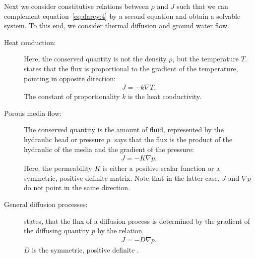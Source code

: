 \begin{example}
  Next we consider constitutive relations between $\rho$ and $J$ such
  that we can complement equation~\eqref{eq:darcy:4} by a second
  equation and obtain a solvable system. To this end, we consider
  thermal diffusion and ground water flow.

  \begin{description}
  \item[Heat conduction:] Here, the conserved quantity is not the
    density $\rho$, but the temperature $T$. 
    states that the flux is proportional to the gradient of the
    temperature, pointing in opposite direction:
    \begin{gather}
      J = -k\nabla T.
    \end{gather}
    The constant of proportionality $k$ is the heat conductivity.
  \item[Porous media flow:] The conserved quantity is the amount of
    fluid, represented by the hydraulic head or pressure
    $p$.  says that the flux is the product of the
    hydraulic  of the media and the gradient of the
    pressure:
    \begin{gather}
      J = -K\nabla p.
    \end{gather}
    Here, the permeability $K$ is either a positive scalar function or
    a symmetric, positive definite matrix. Note that in the latter
    case, $J$ and $\nabla p$ do not point in the same direction.
    \item[General diffusion processes:]  states,
      that the flux of a diffusion process is determined by the
      gradient of the diffusing quantity $p$ by the relation
    \begin{gather}
      J = -D\nabla p.
    \end{gather}
    $D$ is the symmetric, positive definite .
  \end{description}
\end{example}

